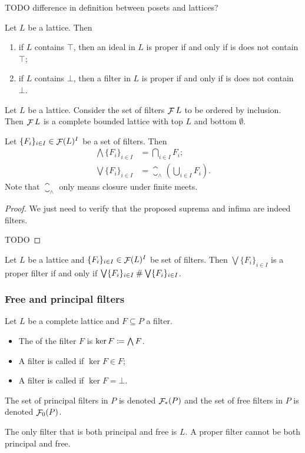 TODO difference in definition between posets and lattices?

\begin{lemma}
Let $L$ be a lattice. Then
\begin{enumerate}
\item if $L$ contains $\top$, then an ideal in $L$ is proper \textup{if and only if} is does not contain $\top$;
\item if $L$ contains $\bot$, then a filter in $L$ is proper \textup{if and only if} is does not contain $\bot$.
\end{enumerate}
\end{lemma}


\begin{proposition}
Let $L$ be a lattice. Consider the set of filters $\mathop{\mathcal{F}}{L}$ to be ordered by inclusion. Then $\mathop{\mathcal{F}}{L}$ is a complete bounded lattice with top $L$ and bottom $\emptyset$.

Let $\{F_i\}_{i\in I} \in \mathop{\mathcal{F}}(L)^I$ be a set of filters. Then
\begin{align*}
\bigwedge \{F_i\}_{i\in I} &= \bigcap_{i\in I}F_i; \\
\bigvee \{F_i\}_{i\in I} &=  \closure_\wedge\left(\bigcup_{i\in I}F_i\right).
\end{align*}
Note that $\closure_\wedge$ only means closure under finite meets.
\end{proposition}
\begin{proof}
We just need to verify that the proposed suprema and infima are indeed filters.

TODO
\end{proof}
\begin{proposition} \label{joinProperFilter}
Let $L$ be a lattice and $\{F_i\}_{i\in I} \in \mathop{\mathcal{F}}(L)^I$ be set of filters. Then $\bigvee \{F_i\}_{i\in I}$ is a proper filter \textup{if and only if} $\bigvee \{F_i\}_{i\in I}\mathbin{\#} \bigvee \{F_i\}_{i\in I}$.
\end{proposition}

\subsubsection{Free and principal filters}
\begin{definition}
Let $L$ be a complete lattice and $F\subseteq P$ a filter.
\begin{itemize}
\item The  of the filter $F$ is $\ker F \coloneqq \bigwedge F$.
\item A filter is called  if $\ker F \in F$;
\item A filter is called  if $\ker F = \bot$.
\end{itemize}
The set of principal filters in $P$ is denoted $\mathop{\mathcal{F}}_*(P)$ and the set of free filters in $P$ is denoted $\mathop{\mathcal{F}}_0(P)$.
\end{definition}
The only filter that is both principal and free is $L$. A proper filter cannot be both principal and free.

